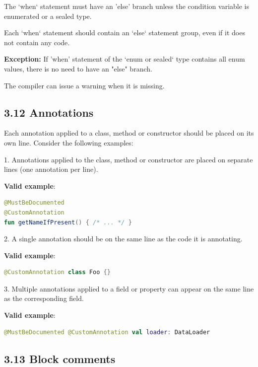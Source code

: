 {{{{The `when` statement must have an 'else' branch unless the condition variable is enumerated or a sealed type.

Each `when` statement should contain an `else` statement group, even if it does not contain any code.



\textbf{Exception:} If 'when' statement of the `enum or sealed` type contains all enum values, there is no need to have an "else" branch.

The compiler can issue a warning when it is missing.



\subsection*{\textbf{3.12 Annotations}}



Each annotation applied to a class, method or constructor should be placed on its own line. Consider the following examples:

1. Annotations applied to the class, method or constructor are placed on separate lines (one annotation per line). 



\textbf{Valid example}:

\begin{lstlisting}[language=Kotlin]
@MustBeDocumented
@CustomAnnotation
fun getNameIfPresent() { /* ... */ }
\end{lstlisting}


2. A single annotation should be on the same line as the code it is annotating.



\textbf{Valid example}:

\begin{lstlisting}[language=Kotlin]
@CustomAnnotation class Foo {}
\end{lstlisting}


3. Multiple annotations applied to a field or property can appear on the same line as the corresponding field.



\textbf{Valid example}:

\begin{lstlisting}[language=Kotlin]
@MustBeDocumented @CustomAnnotation val loader: DataLoader
\end{lstlisting}


\subsection*{\textbf{3.13 Block comments}}



}}}}
